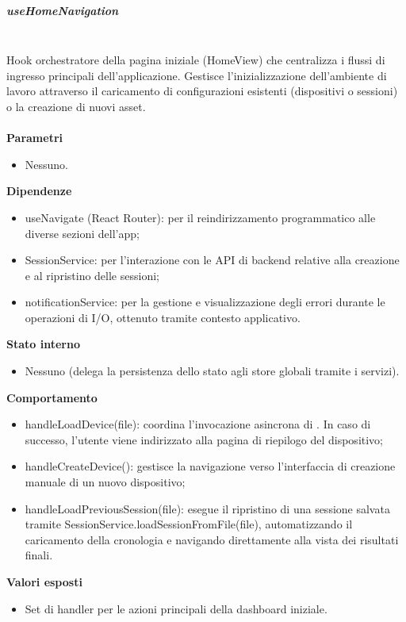 \documentclass[a4paper,12pt]{article}
\begin{document}
                \subparagraph{useHomeNavigation}\mbox{}\\
                Hook orchestratore della pagina iniziale ({\ttfamily HomeView}) che centralizza i flussi di ingresso principali dell'applicazione. Gestisce l'inizializzazione dell'ambiente di lavoro attraverso il caricamento di configurazioni esistenti (dispositivi o sessioni) o la creazione di nuovi asset.\\\\
                \textbf{Parametri}
                \begin{itemize}
                    \item Nessuno.
                \end{itemize}
                \textbf{Dipendenze}
                \begin{itemize}
                    \item {\ttfamily useNavigate} (React Router): per il reindirizzamento programmatico alle diverse sezioni dell'app;
                    \item {\ttfamily SessionService}: per l'interazione con le API di backend relative alla creazione e al ripristino delle sessioni;
                    \item {\ttfamily notificationService}: per la gestione e visualizzazione degli errori durante le operazioni di I/O, ottenuto tramite contesto applicativo.
                \end{itemize}
                \textbf{Stato interno}
                \begin{itemize}
                    \item Nessuno (delega la persistenza dello stato agli store globali tramite i servizi).
                \end{itemize}
                \textbf{Comportamento}
                \begin{itemize}
                    \item {\ttfamily handleLoadDevice(file)}: coordina l'invocazione asincrona di . In caso di successo, l'utente viene indirizzato alla pagina di riepilogo del dispositivo;
                    \item {\ttfamily handleCreateDevice()}: gestisce la navigazione verso l'interfaccia di creazione manuale di un nuovo dispositivo;
                    \item {\ttfamily handleLoadPreviousSession(file)}: esegue il ripristino di una sessione salvata tramite {\ttfamily SessionService.loadSessionFromFile(file)}, automatizzando il caricamento della cronologia e navigando direttamente alla vista dei risultati finali.
                \end{itemize}
                \textbf{Valori esposti}
                \begin{itemize}
                    \item Set di handler per le azioni principali della dashboard iniziale.
                \end{itemize}
                
\end{document}
